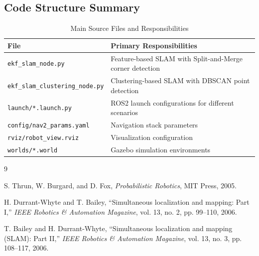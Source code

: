 \documentclass[12pt,a4paper]{article}
\begin{document}
\subsection*{Code Structure Summary}

\begin{table}[H]
\centering
\caption{Main Source Files and Responsibilities}
\begin{tabular}{@{}ll@{}}
\toprule
\textbf{File} & \textbf{Primary Responsibilities} \\
\midrule
\texttt{ekf\_slam\_node.py} & Feature-based SLAM with Split-and-Merge corner detection \\
\texttt{ekf\_slam\_clustering\_node.py} & Clustering-based SLAM with DBSCAN point detection \\
\texttt{launch/*.launch.py} & ROS2 launch configurations for different scenarios \\
\texttt{config/nav2\_params.yaml} & Navigation stack parameters \\
\texttt{rviz/robot\_view.rviz} & Visualization configuration \\
\texttt{worlds/*.world} & Gazebo simulation environments \\
\bottomrule
\end{tabular}
\end{table}

\begin{thebibliography}{9}

S. Thrun, W. Burgard, and D. Fox,
\textit{Probabilistic Robotics},
MIT Press, 2005.

H. Durrant-Whyte and T. Bailey,
``Simultaneous localization and mapping: Part I,''
\textit{IEEE Robotics \& Automation Magazine},
vol. 13, no. 2, pp. 99--110, 2006.

T. Bailey and H. Durrant-Whyte,
``Simultaneous localization and mapping (SLAM): Part II,''
\textit{IEEE Robotics \& Automation Magazine},
vol. 13, no. 3, pp. 108--117, 2006.

\end{thebibliography}
\end{document}
